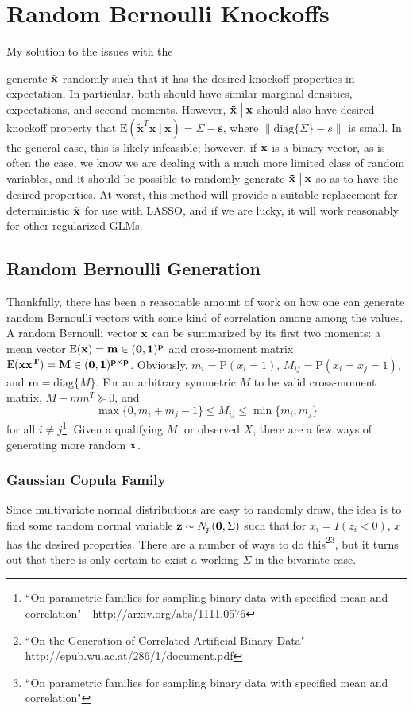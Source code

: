 \documentclass[11pt]{article}
\newcommand{\p}{\mathrm{P}}
\newcommand{\E}{\mathrm{E}}
\newcommand{\diag}[1]{\mathrm{diag}\{#1\}}
\newcommand{\st}{ \; \big | \:}
\theoremstyle{definition}
\begin{document}
\section{Random Bernoulli Knockoffs}
    My solution to the issues with the 

    generate $\bf \tilde x$ randomly such that it has the desired knockoff properties in expectation. In particular, both  should have similar marginal densities, expectations, and second moments. However, $\bf \tilde x\st \bf x$ should also have desired knockoff property that $\E(\mathbf{\tilde x}^T\mathbf x\st \mathbf x) = \Sigma-\mathbf s$, where $\|\diag{\Sigma}-s\|$ is small. In the general case, this is likely infeasible; however, if $\bf x$ is a binary vector, as is often the case, we know we are dealing with a much more limited class of random variables, and it should be possible to randomly generate $\bf \tilde x\st \bf x$ so as to have the desired properties. At worst, this method will provide a suitable replacement for deterministic $\bf \tilde x$ for use with LASSO, and if we are lucky, it will work reasonably for other regularized GLMs. 

\subsection{Random Bernoulli Generation}
Thankfully, there has been a reasonable amount of work on how one can generate random Bernoulli vectors with some kind of correlation among among the values. A random Bernoulli vector $\bf x$ can be summarized by its first two moments: a mean vector $\E(\bf x)=m\in(0,1)^p$ and cross-moment matrix $\E(\bf x\bf x^T)=M\in(0,1)^{p\times p}$. Obviously, $m_i = \p(x_i=1)$, $M_{ij} = \p(x_i=x_j=1)$, and $\mathbf m=\diag{M}$. For an arbitrary symmetric $M$ to be valid cross-moment matrix, $M-mm^T\succeq0$, and
    \[ \max\{0,m_i+m_j -1\} \leq M_{ij} \leq \min\{m_i,m_j\}\]
    for all $i\neq j$\footnote{``On parametric families for sampling binary data with specified mean and correlation" - http://arxiv.org/abs/1111.0576}. Given a qualifying $M$, or observed $X$, there are a few ways of generating more random $\bf x$.

\subsubsection{Gaussian Copula Family}
    Since multivariate normal distributions are easy to randomly draw, the idea is to find some random normal variable $\mathbf z\sim N_p({\bf 0},\Sigma)$ such that,for $x_i = I(z_i<0)$, $x$ has the desired properties. There are a number of ways to do this\footnote{``On the Generation of Correlated Artificial Binary Data" - http://epub.wu.ac.at/286/1/document.pdf}\footnote{``On parametric families for sampling binary data with specified mean and correlation"}, but it turns out that there is only certain to exist a working $\Sigma$ in the bivariate case. 
\end{document}
